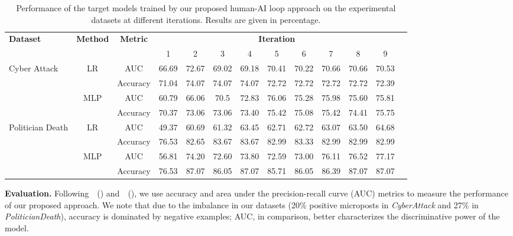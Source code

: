\documentclass[letterpaper]{article}
\begin{document}
\begin{table}[btp]
\centering
\caption{Performance of the target models trained by our proposed human-AI loop approach on the experimental datasets at different iterations. Results are given in percentage. }
\label{tab:res}
\begin{tabular}{lcccccccccccc}
\toprule
\multicolumn{1}{l}{\multirow{2}{*}{\textbf{Dataset}}} & \multicolumn{1}{l}{\multirow{2}{*}{\textbf{Method}}} & \multirow{2}{*}{\textbf{Metric}} & \multicolumn{9}{c}{\textbf{Iteration}}                                         \\ \cline{4-12}
\multicolumn{1}{c}{} & \multicolumn{1}{c}{} & & 1     & 2     & 3     & 4     & 5     & 6     & 7     & 8     & 9     \\ \midrule
\multirow{4}{*}{Cyber Attack}                & \multirow{2}{*}{LR}
& AUC       & 66.69 & 72.67 & 69.02 & 69.18 & 70.41 & 70.22 & 70.66 & 70.66 &  70.53 \\ %
&
& Accuracy  & 71.04 & 74.07 & 74.07 & 74.07 & 72.72 & 72.72 & 72.72 & 72.72 & 72.39  \\ \cline{2-12}
                                             & \multirow{2}{*}{MLP}
& AUC       & 60.79 & 66.06 & 70.5 & 72.83 & 76.06 & 75.28 & 75.98 & 75.60 & 75.81      \\ %
                                             &
& Accuracy  & 70.37 & 73.06 & 73.06 & 73.40  & 75.42 & 75.08 & 75.42 & 74.41 & 75.75  \\ \hline
\multirow{4}{*}{Politician Death}           & \multirow{2}{*}{LR}
& AUC    & 49.37 & 60.69 & 61.32 & 63.45 & 62.71 & 62.72 & 63.07 & 63.50  & 64.68 \\ %
&
& Accuracy  & 76.53 & 82.65 & 83.67 & 83.67 & 82.99 & 83.33 & 82.99 & 82.99 & 82.99  \\ \cline{2-12}

                                             & \multirow{2}{*}{MLP}
& AUC       & 56.81 & 74.20 & 72.60 & 73.80 & 72.59 & 73.00 & 76.11  & 76.52 & 77.17   \\ %
                                             &
& Accuracy  & 76.53 & 87.07 & 86.05 & 87.07  & 85.71 & 86.05 & 86.39 & 87.07 & 87.07    \\ \bottomrule
\end{tabular}
\end{table}

\smallskip
\noindent\textbf{Evaluation.}
Following~\citeauthor{ritter2015weakly}~(\citeyear{ritter2015weakly}) and~\citeauthor{konovalov2017learning}~(\citeyear{konovalov2017learning}), we use accuracy and area under the precision-recall curve (AUC) metrics to measure the performance of our proposed approach. %
We note that due to the imbalance in our datasets (20\% positive microposts in \emph{CyberAttack} and 27\% in \emph{PoliticianDeath}), accuracy is dominated by negative examples; AUC, in comparison, better characterizes the discriminative power of the model.
\end{document}
